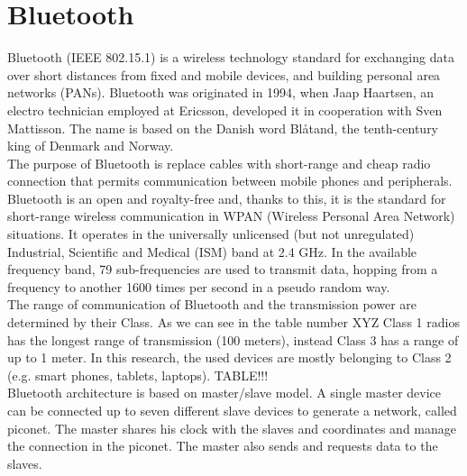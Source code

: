 \section{Bluetooth}
Bluetooth (IEEE 802.15.1) is a wireless technology standard for exchanging data over short distances from fixed and mobile devices, and building personal area networks (PANs).
Bluetooth was originated in 1994, when Jaap Haartsen, an electro technician employed at Ericsson, developed it in cooperation with Sven Mattisson. The name is based on the Danish word Bl\r{a}tand, the tenth-century king of Denmark and Norway. \\
The purpose of Bluetooth is replace cables with short-range and cheap radio connection that permits communication between mobile phones and peripherals.\\
Bluetooth is an open and royalty-free and, thanks to this, it is the standard for short-range wireless communication in WPAN (Wireless Personal Area Network) situations.
It operates in the universally unlicensed (but not unregulated) Industrial, Scientific and Medical (ISM) band at 2.4 GHz.
In the available frequency band, 79 sub-frequencies are used to transmit data, hopping from a frequency to another 1600 times per second in a pseudo random way.\\
\linebreak
The range of communication of Bluetooth and the transmission power are determined by their Class. As we can see in the table number XYZ Class 1 radios has the longest range of transmission (100 meters), instead Class 3 has a range of up to 1 meter. 
In this research, the used devices are mostly belonging to Class 2 (e.g. smart phones, tablets, laptops).
TABLE!!!
\\
Bluetooth architecture is based on master/slave model. A single master device can be connected up to seven different slave devices to generate a network, called piconet. The master shares his clock with the slaves and coordinates and manage the connection in the piconet. The master also sends and requests data to the slaves.

